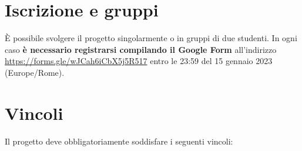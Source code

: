 \documentclass[10pt,a4paper,oneside]{article}
\begin{document}
\section{Iscrizione e gruppi}
È possibile svolgere il progetto singolarmente o in gruppi di due studenti. In ogni caso \textbf{è necessario registrarsi compilando il Google Form} all'indirizzo \url{https://forms.gle/wJCah6iCbX5j5R517} entro le 23:59 del 15 gennaio 2023 (Europe/Rome).


\section{Vincoli}
Il progetto deve obbligatoriamente soddisfare i seguenti vincoli:
\end{document}
